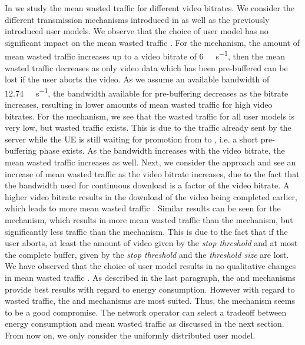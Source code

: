 In  we study the mean wasted traffic \meanwastedtraffic for different video bitrates.
We consider the different transmission mechanisms introduced in  as well as the previously introduced user models.
We observe that the choice of user model has no significant impact on the mean wasted traffic \meanwastedtraffic.
For the \download mechanism, the amount of mean wasted traffic \meanwastedtraffic increases up to a video bitrate of \SI{6}{\mega\bit\per\second}, then the mean wasted traffic \meanwastedtraffic decreases as only video data which has been pre-buffered can be lost if the user aborts the video.
As we assume an available bandwidth of \SI{12.74}{\mega\bit\per\second}, the bandwidth available for pre-buffering decreases as the bitrate increases, resulting in lower amounts of mean wasted traffic \meanwastedtraffic for high video bitrates.
For the \live mechanism, we see that the wasted traffic for all user models is very low, but wasted traffic exists.
This is due to the traffic already sent by the server while the \gls{UE} is still waiting for promotion from \rrcidle to \rrcconnected, i.e. a short pre-buffering phase exists.
As the bandwidth increases with the video bitrate, the mean wasted traffic \meanwastedtraffic increases as well.
Next, we consider the \serviceprovisioning approach and see an increase of mean wasted traffic \meanwastedtraffic as the video bitrate increases, due to the fact that the bandwidth used for continuous download is a factor of the video bitrate.
A higher video bitrate results in the download of the video being completed earlier, which leads to more mean wasted traffic \meanwastedtraffic.
Similar results can be seen for the \streaming mechanism, which results in more mean wasted traffic \meanwastedtraffic than the \live mechanism, but significantly less traffic than the \serviceprovisioning mechanism.
This is due to the fact that if the user aborts, at least the amount of video given by the \emph{stop threshold} \bufferlower and at most the complete buffer, given by the \emph{stop threshold} and the \emph{threshold size} are lost.
We have observed that the choice of user model results in no qualitative changes in mean wasted traffic \meanwastedtraffic.
As described in the last paragraph, the \download and \streaming mechanisms provide best results with regard to energy consumption.
However with regard to wasted traffic, the \live and \streaming mechanisms are most suited.
Thus, the \streaming mechanism seems to be a good compromise.
The network operator can select a tradeoff between energy consumption and mean wasted traffic \meanwastedtraffic as discussed in the next section.
From now on, we only consider the uniformly distributed user model.

